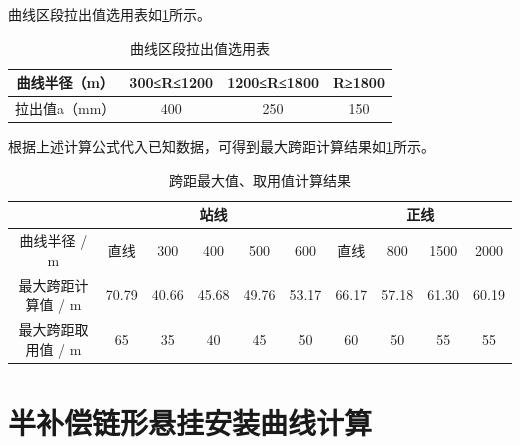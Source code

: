 曲线区段拉出值选用表如\ref*{tab:曲线区段拉出值选用表}所示。
\begin{table}[h]
	\centering
	\caption{曲线区段拉出值选用表}
	\label{tab:曲线区段拉出值选用表}
	
		\begin{tabular}{|c|c|c|c|}
			\hline
			曲线半径（m）  & 300≤R≤1200 & 1200≤R≤1800 & R≥1800 \\ \hline
			拉出值a（mm） & 400        & 250         & 150    \\ \hline
		\end{tabular}%
	
\end{table}
根据上述计算公式代入已知数据，可得到最大跨距计算结果如\ref{tab:曲线区段拉出值选用表}所示。
\begin{table}[h]
	\centering
	\caption{跨距最大值、取用值计算结果}
	\label{tab:my-table}
		\begin{tabular}{|c|ccccc|cccc|}
			\hline
			&
			\multicolumn{5}{c|}{站线} &
			\multicolumn{4}{c|}{正线} \\ \hline
			曲线半径 / m &
			\multicolumn{1}{c|}{直线} &
			\multicolumn{1}{c|}{300} &
			\multicolumn{1}{c|}{400} &
			\multicolumn{1}{c|}{500} &
			600 &
			\multicolumn{1}{c|}{直线} &
			\multicolumn{1}{c|}{800} &
			\multicolumn{1}{c|}{1500} &
			2000 \\ \hline
			最大跨距计算值 / m &
			\multicolumn{1}{c|}{70.79} &
			\multicolumn{1}{c|}{40.66} &
			\multicolumn{1}{c|}{45.68} &
			\multicolumn{1}{c|}{49.76} &
			53.17 &
			\multicolumn{1}{c|}{66.17} &
			\multicolumn{1}{c|}{57.18} &
			\multicolumn{1}{c|}{61.30} &
			60.19 \\ \hline
			最大跨距取用值 / m &
			\multicolumn{1}{c|}{65} &
			\multicolumn{1}{c|}{35} &
			\multicolumn{1}{c|}{40} &
			\multicolumn{1}{c|}{45} &
			50 &
			\multicolumn{1}{c|}{60} &
			\multicolumn{1}{c|}{50} &
			\multicolumn{1}{c|}{55} &
			55 \\ \hline
		\end{tabular}%
\end{table}
\section{半补偿链形悬挂安装曲线计算}
